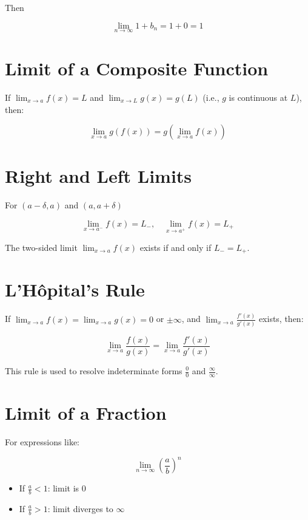 Then 

\[
    \lim_{n \to \infty} 1 + b_n = 1 + 0 = 1
\]

\QED 

\section{Limit of a Composite Function}

If \( \lim_{x \to a} f(x) = L\) and \( \lim_{x \to L} g(x) = g(L)\) (i.e., \(g\) is continuous at \(L\)), then:

\[
    \lim_{x \to a} g(f(x)) = g\left(\lim_{x \to a} f(x)\right)
\]

\section{Right and Left Limits}

For \((a - \delta, a )\) and \((a, a + \delta )\)

\[
    \lim_{x \to a^-} f(x) = L_-, \quad \lim_{x \to a^+} f(x) = L_+
\]

The two-sided limit \( \lim_{x \to a} f(x)\) exists if and only if \(L_- = L_+\).

\section{L’Hôpital’s Rule}

If \( \lim_{x \to a} f(x) = \lim_{x \to a} g(x) = 0\) or \(\pm\infty\), and \( \lim_{x \to a} \frac{f'(x)}{g'(x)}\) exists, then:

\[
    \lim_{x \to a} \frac{f(x)}{g(x)} = \lim_{x \to a} \frac{f'(x)}{g'(x)}
\]

This rule is used to resolve indeterminate forms \(\frac{0}{0}\) and \(\frac{\infty}{\infty}\).

\section{Limit of a Fraction}

For expressions like:

\[
    \lim_{n \to \infty} {\left( \frac{a}{b} \right)}^n
\]

\begin{itemize}

    \item If \(\frac{a}{b} < 1\): limit is \(0\)

    \item If \(\frac{a}{b} > 1\): limit diverges to \(\infty\)

\end{itemize}

